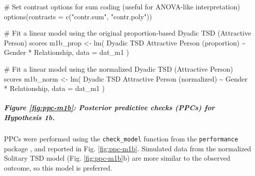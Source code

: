\documentclass[
  bookmarksnumbered]{article}
\newenvironment{Shaded}{\begin{snugshade}}{\end{snugshade}}
\newcommand{\AttributeTok}[1]{\textcolor[rgb]{0.80,0.80,0.80}{#1}}
\newcommand{\CommentTok}[1]{\textcolor[rgb]{0.50,0.62,0.50}{#1}}
\newcommand{\FunctionTok}[1]{\textcolor[rgb]{0.94,0.94,0.56}{#1}}
\newcommand{\NormalTok}[1]{\textcolor[rgb]{0.80,0.80,0.80}{#1}}
\newcommand{\OtherTok}[1]{\textcolor[rgb]{0.94,0.94,0.56}{#1}}
\newcommand{\SpecialCharTok}[1]{\textcolor[rgb]{0.86,0.64,0.64}{#1}}
\newcommand{\StringTok}[1]{\textcolor[rgb]{0.80,0.58,0.58}{#1}}
\begin{document}
\begin{Shaded}
\begin{Highlighting}[]
\CommentTok{\# Set contrast options for sum coding (useful for ANOVA{-}like interpretation)}
\FunctionTok{options}\NormalTok{(}\AttributeTok{contrasts =} \FunctionTok{c}\NormalTok{(}\StringTok{"contr.sum"}\NormalTok{, }\StringTok{"contr.poly"}\NormalTok{))}

\CommentTok{\# Fit a linear model using the original proportion{-}based Dyadic TSD (Attractive Person) scores}
\NormalTok{m1b\_prop }\OtherTok{\textless{}{-}} \FunctionTok{lm}\NormalTok{(}
  \StringTok{\textasciigrave{}}\AttributeTok{Dyadic TSD Attractive Person (proportion)}\StringTok{\textasciigrave{}} \SpecialCharTok{\textasciitilde{}}\NormalTok{ Gender }\SpecialCharTok{*}\NormalTok{ Relationship,}
  \AttributeTok{data =}\NormalTok{ dat\_m1}
\NormalTok{)}

\CommentTok{\# Fit a linear model using the normalized Dyadic TSD (Attractive Person) scores}
\NormalTok{m1b\_norm }\OtherTok{\textless{}{-}} \FunctionTok{lm}\NormalTok{(}
  \StringTok{\textasciigrave{}}\AttributeTok{Dyadic TSD Attractive Person (normalized)}\StringTok{\textasciigrave{}} \SpecialCharTok{\textasciitilde{}}\NormalTok{ Gender }\SpecialCharTok{*}\NormalTok{ Relationship,}
  \AttributeTok{data =}\NormalTok{ dat\_m1}
\NormalTok{)}
\end{Highlighting}
\end{Shaded}

\subparagraph{Figure \ref{fig:ppc-m1b}: Posterior predictive checks (PPCs) for Hypothesis 1b.}\label{figure-reffigppc-m1b-posterior-predictive-checks-ppcs-for-hypothesis-1b.}

PPCs were performed using the \texttt{check\_model} function from the \texttt{performance} package \autocite{ludecke2021}, and reported in Fig. \ref{fig:ppc-m1b}. Simulated data from the normalized Solitary TSD model (Fig. \ref{fig:ppc-m1b}b) are more similar to the observed outcome, so this model is preferred.
\end{document}
